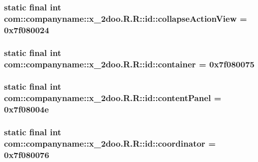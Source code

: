 \hypertarget{classcom_1_1companyname_1_1x__2doo_1_1_r_1_1id_de1e91f5a93a3b52429b7e79807018a2}{
\subsubsection[{collapseActionView}]{\setlength{\rightskip}{0pt plus 5cm}static final int com::companyname::x\_\-2doo.R.R::id::collapseActionView = 0x7f080024}}
\label{classcom_1_1companyname_1_1x__2doo_1_1_r_1_1id_de1e91f5a93a3b52429b7e79807018a2}


\hypertarget{classcom_1_1companyname_1_1x__2doo_1_1_r_1_1id_a7a8162911662999d4c2dbb347a2dc4d}{
\subsubsection[{container}]{\setlength{\rightskip}{0pt plus 5cm}static final int com::companyname::x\_\-2doo.R.R::id::container = 0x7f080075}}
\label{classcom_1_1companyname_1_1x__2doo_1_1_r_1_1id_a7a8162911662999d4c2dbb347a2dc4d}


\hypertarget{classcom_1_1companyname_1_1x__2doo_1_1_r_1_1id_b8d95a6a4fac9992b5bef80b8d9f5194}{
\subsubsection[{contentPanel}]{\setlength{\rightskip}{0pt plus 5cm}static final int com::companyname::x\_\-2doo.R.R::id::contentPanel = 0x7f08004e}}
\label{classcom_1_1companyname_1_1x__2doo_1_1_r_1_1id_b8d95a6a4fac9992b5bef80b8d9f5194}


\hypertarget{classcom_1_1companyname_1_1x__2doo_1_1_r_1_1id_78e95af10bf9b64c5c7a8af3e62cd783}{
\subsubsection[{coordinator}]{\setlength{\rightskip}{0pt plus 5cm}static final int com::companyname::x\_\-2doo.R.R::id::coordinator = 0x7f080076}}
\label{classcom_1_1companyname_1_1x__2doo_1_1_r_1_1id_78e95af10bf9b64c5c7a8af3e62cd783}


